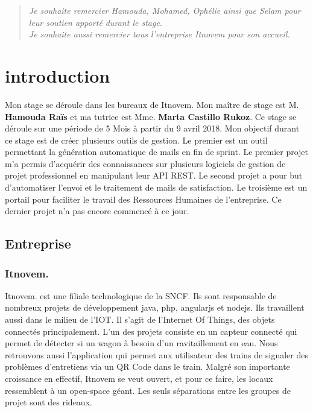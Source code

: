 \documentclass[12pt, twoside, openright]{report}
\begin{document}
\renewcommand{\abstractname}{Remerciement}
\begin{abstract}
\begin{minipage}{0.9\textwidth}
\begin{flushright}
\emph{Je souhaite remercier Hamouda, Mohamed, Ophélie ainsi que Selam pour leur soutien apporté durant le stage.}\\

\emph{Je souhaite aussi remercier tous l'entreprise Itnovem pour son accueil.}
\end{flushright}
\end{minipage}



\end{abstract}
\newpage


\chapter{introduction}

Mon stage se déroule dans les bureaux de Itnovem. Mon maître de stage est M. \textbf{Hamouda Raïs} et ma tutrice est Mme. \textbf{Marta Castillo Rukoz}. Ce stage se déroule sur une période de 5 Mois à partir du 9 avril 2018. Mon objectif durant ce stage est de créer plusieurs outils de gestion. Le premier est un outil permettant la génération automatique de mails en fin de sprint. Le premier projet m'a permis d'acquérir des connaissances sur plusieurs logiciels de gestion de projet professionnel en manipulant leur API REST. Le second projet a pour but d'automatiser l'envoi et le traitement de mails de satisfaction. Le troisième est un portail pour faciliter le travail des Ressources Humaines de l'entreprise. Ce dernier projet n'a pas encore commencé à ce jour.

\section{Entreprise}

\subsection{Itnovem.}
% 
% 
% 
Itnovem. est une filiale technologique de la SNCF. Ils sont responsable de nombreux projets de développement java, php, angularjs et nodejs. Ils travaillent aussi dans le milieu de l'IOT. Il s'agit de l'Internet Of Things, des objets connectés principalement. L'un des projets consiste en un capteur connecté qui permet de détecter si un wagon à besoin d'un ravitaillement en eau. Nous retrouvons aussi l'application qui permet aux utilisateur des trains de signaler des problèmes d'entretiens via un QR Code dans le train. Malgré son importante croissance en effectif, Itnovem se veut ouvert, et pour ce faire, les locaux ressemblent à un open-space géant. Les seuls séparations entre les groupes de projet sont des rideaux.
\end{document}

